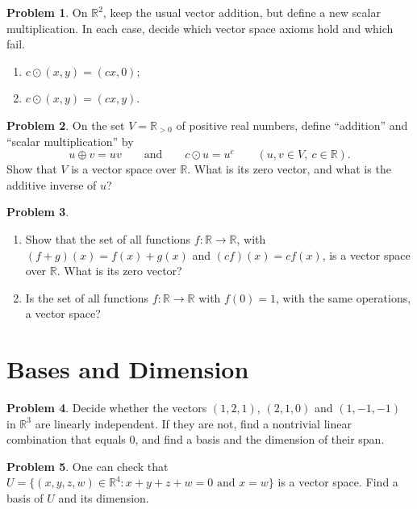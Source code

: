 \documentclass[11pt]{article}
\theoremstyle{definition}
\newtheorem{problem}{Problem}[section]
\begin{document}
\begin{problem}\label{pr:weird-ops}
    On $\mathbb{R}^2$, keep the usual vector addition, but define a new scalar multiplication. In each case, decide which vector space axioms hold and which fail.
    \begin{enumerate}[label=(\alph*)]
        \item $c \odot (x, y) = (cx, 0)$;
        \item $c \odot (x, y) = (cx, y)$.
    \end{enumerate}
\end{problem}

\begin{problem}\label{pr:positive-reals}
    On the set $V = \mathbb{R}_{>0}$ of positive real numbers, define ``addition'' and ``scalar multiplication'' by
    \[u \oplus v = uv \qquad \text{and} \qquad c \odot u = u^c \qquad (u, v \in V, \ c \in \mathbb{R}).\]
    Show that $V$ is a vector space over $\mathbb{R}$. What is its zero vector, and what is the additive inverse of $u$?
\end{problem}

\begin{problem}\label{pr:functions}
    \begin{enumerate}[label=(\alph*)]
        \item Show that the set of all functions $f: \mathbb{R} \to \mathbb{R}$, with $(f + g)(x) = f(x) + g(x)$ and $(cf)(x) = c f(x)$, is a vector space over $\mathbb{R}$. What is its zero vector?
        \item Is the set of all functions $f: \mathbb{R} \to \mathbb{R}$ with $f(0) = 1$, with the same operations, a vector space?
    \end{enumerate}
\end{problem}

\section{Bases and Dimension}

\begin{problem}\label{pr:indep}
    Decide whether the vectors $(1, 2, 1)$, $(2, 1, 0)$ and $(1, -1, -1)$ in $\mathbb{R}^3$ are linearly independent. If they are not, find a nontrivial linear combination that equals $0$, and find a basis and the dimension of their span.
\end{problem}

\begin{problem}\label{pr:basisU}
    One can check that $U = \{(x, y, z, w) \in \mathbb{R}^4 : x + y + z + w = 0 \text{ and } x = w\}$ is a vector space. Find a basis of $U$ and its dimension.
\end{problem}
\end{document}
